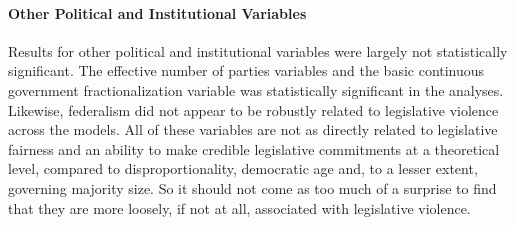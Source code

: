 \documentclass[a4paper]{article}\usepackage[]{graphicx}\usepackage[]{color}
\begin{document}
\paragraph{Other Political and Institutional Variables}

Results for other political and institutional variables were largely not statistically significant. The effective number of parties variables and the basic continuous government fractionalization variable was statistically significant in the analyses. Likewise, federalism did not appear to be robustly related to legislative violence across the models. All of these variables are not as directly related to legislative fairness and an ability to make credible legislative commitments at a theoretical level, compared to disproportionality, democratic age and, to a lesser extent, governing majority size. So it should not come as too much of a surprise to find that they are more loosely, if not at all, associated with legislative violence.
\end{document}
